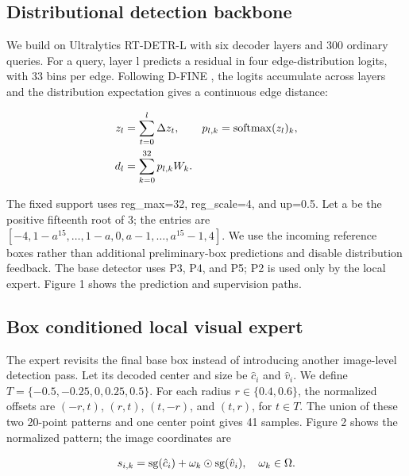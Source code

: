 \subsection{Distributional detection backbone}

We build on Ultralytics RT-DETR-L with six decoder layers and 300 ordinary queries. For a query, layer l predicts a residual in four edge-distribution logits, with 33 bins per edge. Following D-FINE \cite{peng2025dfine}, the logits accumulate across layers and the distribution expectation gives a continuous edge distance:


\begin{equation}\label{eq:distribution}
\begin{aligned}
z_l&=\sum_{t=0}^{l}\Delta z_t,\qquad p_{l,k}=\operatorname{softmax}(z_l)_k,\\
d_l&=\sum_{k=0}^{32}p_{l,k}W_k.
\end{aligned}\end{equation}

The fixed support uses reg\_max=32, reg\_scale=4, and up=0.5. Let a be the positive fifteenth root of 3; the entries are $[-4,1-a^{15},\ldots,1-a,0,a-1,\ldots,a^{15}-1,4]$. We use the incoming reference boxes rather than additional preliminary-box predictions and disable distribution feedback. The base detector uses P3, P4, and P5; P2 is used only by the local expert. Figure 1 shows the prediction and supervision paths.


\subsection{Box conditioned local visual expert}

The expert revisits the final base box instead of introducing another image-level detection pass. Let its decoded center and size be $\hat c_i$ and $\hat v_i$. We define $T=\{-0.5,-0.25,0,0.25,0.5\}$. For each radius $r\in\{0.4,0.6\}$, the normalized offsets are $(-r,t)$, $(r,t)$, $(t,-r)$, and $(t,r)$, for $t\in T$. The union of these two 20-point patterns and one center point gives 41 samples. Figure 2 shows the normalized pattern; the image coordinates are


\begin{equation}\label{eq:sampling}
s_{i,k}=\operatorname{sg}(\hat c_i)+\omega_k\odot\operatorname{sg}(\hat v_i),\quad\omega_k\in\Omega.
\end{equation}


